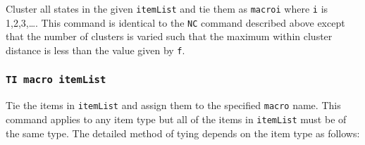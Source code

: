 Cluster all states in the given 
\texttt{itemList} and tie them as \texttt{macroi} where 
\texttt{i} is 1,2,3,\ldots. This command is identical to the
\texttt{NC} command described above except that the number of clusters
is varied such that the maximum within cluster distance is less than
the value given by \texttt{f}.

\subsubsection*{\tt TI macro itemList}

Tie the items in \texttt{itemList} and assign them to the specified 
\texttt{macro} name.  This command applies to any item type but 
all of the items in \texttt{itemList} must be of the same type.
The detailed method of tying depends on the item type as follows:
